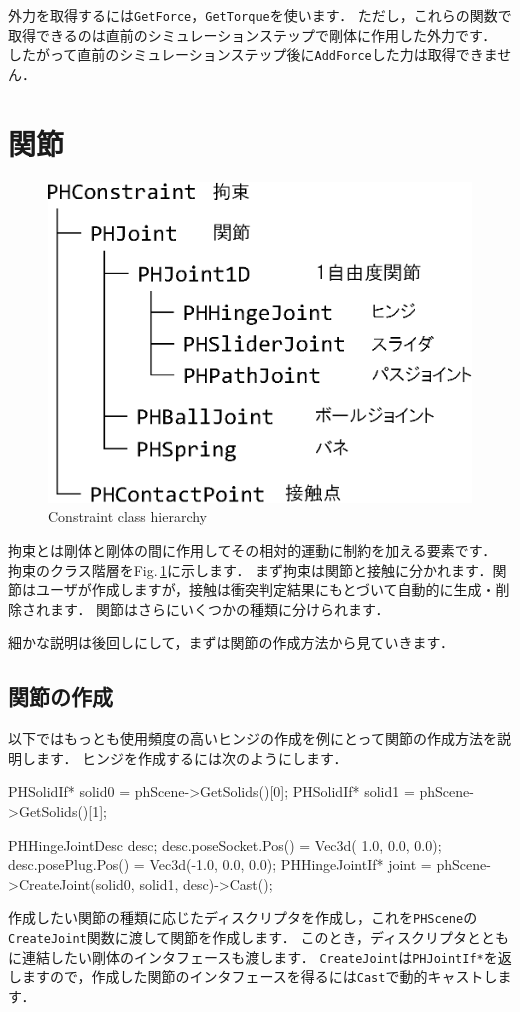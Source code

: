 \KLUDGE 外力を取得するには\texttt{GetForce}\KLUDGE ，\texttt{GetTorque}\KLUDGE を使います．
\KLUDGE ただし，これらの関数で取得できるのは直前のシミュレーションステップで剛体に作用した外力です．
\KLUDGE したがって直前のシミュレーションステップ後に\texttt{AddForce}\KLUDGE した力は取得できません．


\section{\KLUDGE 関節}

\begin{figure}[t]
\begin{center}
\includegraphics[width=.5\hsize]{fig/phconstraint.eps}
\end{center}
\caption{Constraint class hierarchy}
\label{fig_phconstraint}
\end{figure}

\KLUDGE 拘束とは剛体と剛体の間に作用してその相対的運動に制約を加える要素です．
\KLUDGE 拘束のクラス階層をFig.\,\ref{fig_phconstraint}\KLUDGE に示します．
\KLUDGE まず拘束は関節と接触に分かれます．関節はユーザが作成しますが，接触は衝突判定結果にもとづいて自動的に生成・削除されます．
\KLUDGE 関節はさらにいくつかの種類に分けられます．

\KLUDGE 細かな説明は後回しにして，まずは関節の作成方法から見ていきます．

\subsection*{\KLUDGE 関節の作成}

\KLUDGE 以下ではもっとも使用頻度の高いヒンジの作成を例にとって関節の作成方法を説明します．
\KLUDGE ヒンジを作成するには次のようにします．
\begin{sourcecode}
PHSolidIf* solid0 = phScene->GetSolids()[0];
PHSolidIf* solid1 = phScene->GetSolids()[1];

PHHingeJointDesc desc;
desc.poseSocket.Pos() = Vec3d( 1.0, 0.0, 0.0);
desc.posePlug.Pos()   = Vec3d(-1.0, 0.0, 0.0);
PHHingeJointIf* joint
    = phScene->CreateJoint(solid0, solid1, desc)->Cast();
\end{sourcecode}
\KLUDGE 作成したい関節の種類に応じたディスクリプタを作成し，これを\texttt{PHScene}\KLUDGE の\texttt{CreateJoint}\KLUDGE 関数に渡して関節を作成します．
\KLUDGE このとき，ディスクリプタとともに連結したい剛体のインタフェースも渡します．
\texttt{CreateJoint}\KLUDGE は\texttt{PHJointIf*}\KLUDGE を返しますので，作成した関節のインタフェースを得るには\texttt{Cast}\KLUDGE で動的キャストします．


